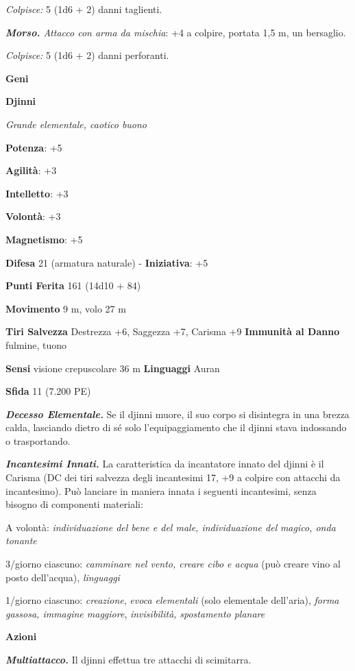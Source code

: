 \begin{multicols}{2}
\emph{Colpisce:} 5 (1d6 + 2) danni taglienti.

\emph{\textbf{Morso.} Attacco con arma da mischia}: +4 a colpire,
portata 1,5 m, un bersaglio.

\emph{Colpisce:} 5 (1d6 + 2) danni perforanti.



\textbf{Geni}

\textbf{Djinni}

\emph{Grande elementale, caotico buono}

\textbf{Potenza}: +5

\textbf{Agilità}: +3

\textbf{Intelletto}: +3

\textbf{Volontà}: +3

\textbf{Magnetismo}: +5

\textbf{Difesa} 21 (armatura naturale) - \textbf{Iniziativa}: +5

\textbf{Punti Ferita} 161 (14d10 + 84)

\textbf{Movimento} 9 m, volo 27 m

\textbf{Tiri Salvezza} Destrezza +6, Saggezza +7, Carisma +9
\textbf{Immunità al Danno} fulmine, tuono

\textbf{Sensi} visione crepuscolare 36 m
\textbf{Linguaggi} Auran

\textbf{Sfida} 11 (7.200 PE)

\emph{\textbf{Decesso Elementale.}} Se il djinni muore, il suo corpo si
disintegra in una brezza calda, lasciando dietro di sé solo
l'equipaggiamento che il djinni stava indossando o trasportando.

\emph{\textbf{Incantesimi Innati.}} La caratteristica da incantatore
innato del djinni è il Carisma (DC dei tiri salvezza degli incantesimi
17, +9 a colpire con attacchi da incantesimo). Può lanciare in maniera
innata i seguenti incantesimi, senza bisogno di componenti materiali:

A volontà: \emph{individuazione del bene e del male, individuazione del}
\emph{magico, onda tonante}

3/giorno ciascuno: \emph{camminare nel vento, creare cibo e acqua} (può
creare vino al posto dell'acqua), \emph{linguaggi}

1/giorno ciascuno: \emph{creazione}, \emph{evoca elementali} (solo
elementale dell'aria), \emph{forma gassosa, immagine maggiore},
\emph{invisibilità,} \emph{spostamento planare}

\textbf{Azioni}

\emph{\textbf{Multiattacco.}} Il djinni effettua tre attacchi di
scimitarra.


\end{multicols}
